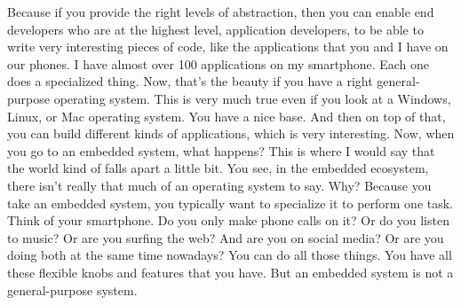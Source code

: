 Because if you provide the right levels of abstraction, then you can enable end developers who are at the highest level, application developers, to be able to write very interesting pieces of code, like the applications that you and I have on our phones.
I have almost over 100 applications on my smartphone.
Each one does a specialized thing.
Now, that's the beauty if you have a right general-purpose operating system.
This is very much true even if you look at a Windows, Linux, or Mac operating system.
You have a nice base.
And then on top of that, you can build different kinds of applications, which is very interesting.
Now, when you go to an embedded system, what happens?
This is where I would say that the world kind of falls apart a little bit.
You see, in the embedded ecosystem, there isn't really that much of an operating system to say.
Why?
Because you take an embedded system, you typically want to specialize it to perform one task.
Think of your smartphone.
Do you only make phone calls on it?
Or do you listen to music?
Or are you surfing the web?
And are you on social media?
Or are you doing both at the same time nowadays?
You can do all those things.
You have all these flexible knobs and features that you have.
But an embedded system is not a general-purpose system.

